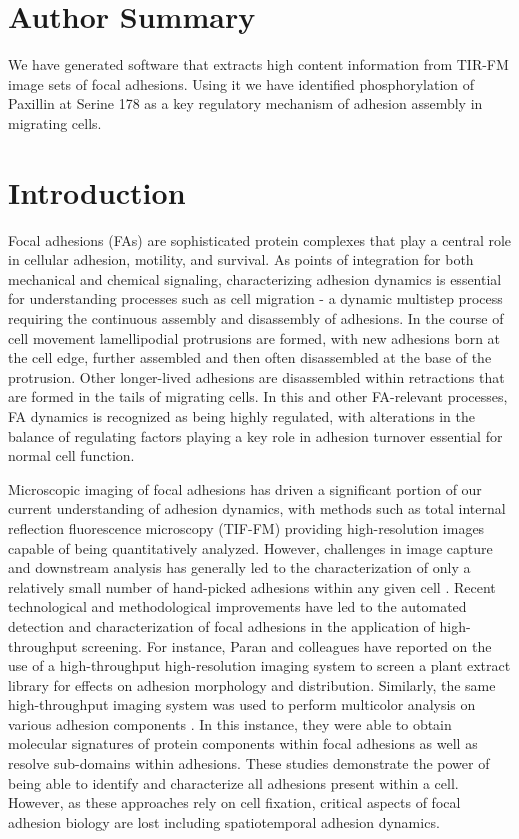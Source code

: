 \documentclass[10pt,draft]{article}
\begin{document}
\section*{Author Summary}

We have generated software that extracts high content information from TIR-FM image sets of focal adhesions.  Using it we have identified phosphorylation of Paxillin at Serine 178 as a key regulatory mechanism of adhesion assembly in migrating cells.

\section*{Introduction}

Focal adhesions (FAs) are sophisticated protein complexes that play a central role in cellular adhesion, motility, and survival. As points of integration for both mechanical and chemical signaling, characterizing adhesion dynamics is essential for understanding processes such as cell migration - a dynamic multistep process requiring the continuous assembly and disassembly of adhesions. In the course of cell movement lamellipodial protrusions are formed, with new adhesions born at the cell edge, further assembled and then often disassembled at the base of the protrusion. Other longer-lived adhesions are disassembled within retractions that are formed in the tails of migrating cells. In this and other FA-relevant processes, FA dynamics is recognized as being highly regulated, with alterations in the balance of regulating factors playing a key role in adhesion turnover essential for normal cell function.

Microscopic imaging of focal adhesions has driven a significant portion of our current understanding of adhesion dynamics, with methods such as total internal reflection fluorescence microscopy (TIF-FM) providing high-resolution images capable of being quantitatively analyzed. However, challenges in image capture and downstream analysis has generally led to the characterization of only a relatively small number of hand-picked adhesions within any given cell \cite{Webb2004}. Recent technological and methodological improvements have led to the automated detection and characterization of focal adhesions in the application of high-throughput screening. For instance, Paran and colleagues have reported on the use of a high-throughput high-resolution imaging system to screen a plant extract library for effects on adhesion morphology and distribution. Similarly, the same high-throughput imaging system was used to perform multicolor analysis on various adhesion components \cite{Zamir2008}. In this instance, they were able to obtain molecular signatures of protein components within focal adhesions as well as resolve sub-domains within adhesions. These studies demonstrate the power of being able to identify and characterize all adhesions present within a cell. However, as these approaches rely on cell fixation, critical aspects of focal adhesion biology are lost including spatiotemporal adhesion dynamics.
\end{document}

